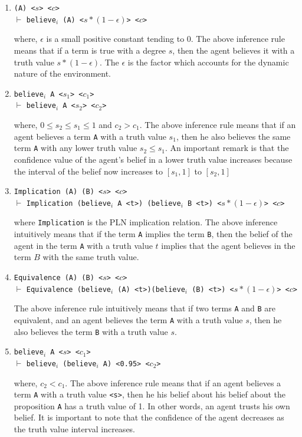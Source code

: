 \documentclass[12pt]{article}
\begin{document}
\begin{enumerate}
\item
\texttt{(A) <$s$> <$c$>}\\
$\vdash$
\texttt{believe$_i$ (A) <$s*(1-\epsilon)$> <$c$>}

where, $\epsilon$ is a small positive constant tending to 0. The above inference rule means that if a term is true with a degree $s$, then the agent believes it with a truth value $s*(1-\epsilon)$. The $\epsilon$ is the factor which accounts for the dynamic nature of the environment.
\item
\texttt{believe$_i$ A <$s_1$> <$c_1$>}\\
$\vdash$
\texttt{believe$_i$ A <$s_2$> <$c_2$>}

where, $0\leq s_2\leq s_1\leq 1$ and $c_2>c_1$. The above inference rule means that if an agent believes a term \texttt{A} with a truth value $s_1$, then he also believes the same term \texttt{A} with any lower truth value $s_2\leq s_1$. An important remark is that the confidence value of the agent's belief in a lower truth value increases because the interval of the belief now increases to $[s_1,1]$ to $[s_2,1]$  
\item
\texttt{Implication (A) (B) <$s$> <$c$>}\\
$\vdash$
\texttt{Implication (believe$_i$ A <t>) (believe$_i$ B <t>) <$s*(1-\epsilon)$> <$c$>}

where \texttt{Implication} is the PLN implication relation. The above inference intuitively means that if the term \texttt{A} implies the term \texttt{B}, then the belief of the agent in the term \texttt{A} with a truth value $t$ implies that the agent believes in the term $B$ with the same truth value. 



\item
\texttt{Equivalence (A) (B) <$s$> <$c$>}\\
$\vdash$
\texttt{Equivalence (believe$_i$ (A) <t>)}\texttt{(believe$_i$ (B) <t>) <$s*(1-\epsilon)$> <$c$>}

The above inference rule intuitively means that if two terms \texttt{A} and \texttt{B} are equivalent, and an agent believes the term \texttt{A} with a truth value $s$, then he also believes the term \texttt{B} with a truth value $s$.

\item
\texttt{believe$_i$ A <$s$>  <$c_1$> }\\
$\vdash$
\texttt{believe$_i$  (believe$_i$ A) <0.95> <$c_2$>}

where, $c_2 < c_1$. The above inference rule means that if an agent believes a term \texttt{A} with a truth value \texttt{<s>}, then he his belief about his belief about the proposition \texttt{A} has a truth value of 1. In other words, an agent trusts his own belief. It is important to note that the confidence of the agent decreases as the truth value interval increases.

\end{enumerate}
\end{document}
